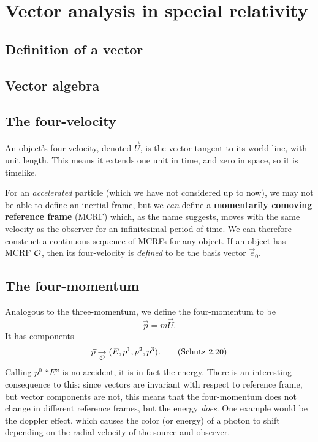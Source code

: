 \documentclass[gr-notes.tex]{subfiles}
\begin{document}
\setcounter{chapter}{1}

\chapter{Vector analysis in special relativity}

\section{Definition of a vector}

\section{Vector algebra}

\section{The four-velocity}

An object's four velocity, denoted $\vec{U}$, is the vector tangent to its world line, with unit length. This means it extends one unit in time, and zero in space, so it is timelike.

For an \emph{accelerated} particle (which we have not considered up to now), we may not be able to define an inertial frame, but we \emph{can} define a \textbf{momentarily comoving reference frame} (MCRF) which, as the name suggests, moves with the same velocity as the observer for an infinitesimal period of time. We can therefore construct a continuous sequence of MCRFs for any object. If an object has MCRF $\mathcal{O}$, then its four-velocity is \emph{defined} to be the basis vector $\vec{e}_0$.


\section{The four-momentum}

Analogous to the three-momentum, we define the four-momentum to be
%
\begin{displaymath}
  \vec{p} = m \vec{U}.
%
  \tag{Schutz 2.19}
  \label{schutz:2.19}
\end{displaymath}
%
It has components
%
\begin{displaymath}
  \vec{p} \underset{\obs}{\to} (E, p^1, p^2, p^3).
%
  \tag{Schutz 2.20}
  \label{schutz:2.20}
\end{displaymath}
%
Calling $p^0$ ``$E$'' is no accident, it is in fact the energy. There is an interesting consequence to this: since vectors are invariant with respect to reference frame, but vector components are not, this means that the four-momentum does not change in different reference frames, but the energy \emph{does}. One example would be the doppler effect, which causes the color (or energy) of a photon to shift depending on the radial velocity of the source and observer.
\end{document}
